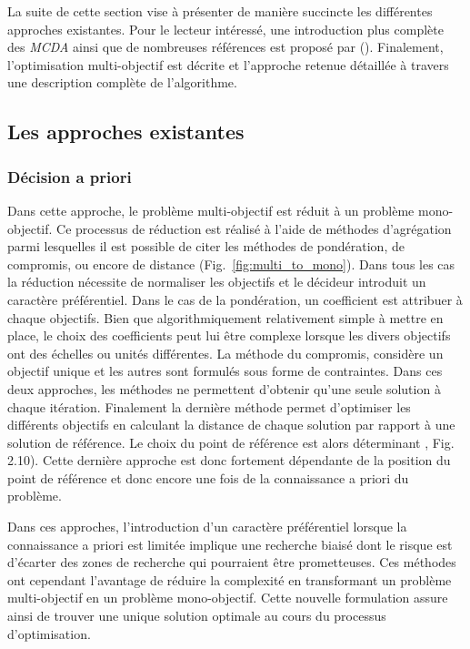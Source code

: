 La suite de cette section vise à présenter de manière succincte les différentes
approches existantes. Pour le lecteur intéressé, une introduction plus complète
des \textit{MCDA} ainsi que de nombreuses références est proposé par ().
Finalement, l’optimisation multi-objectif est décrite et l’approche retenue
détaillée à travers une description complète de l’algorithme.

\subsection{Les approches existantes} %
\label{sub:les_approches_existantes}
\subsubsection{Décision a priori} %
\label{ssub:decision_a_priori}
Dans cette approche, le problème multi-objectif est réduit à un problème mono-objectif.
Ce processus de réduction est réalisé à l’aide de méthodes d’agrégation parmi lesquelles
il est possible de citer les méthodes de pondération, de compromis,
ou encore de distance (Fig.~\ref{fig:multi_to_mono}). Dans tous les cas la réduction
nécessite de normaliser les objectifs et le décideur introduit un caractère préférentiel.
Dans le cas de la pondération, un coefficient est attribuer à chaque objectifs. Bien que
algorithmiquement relativement simple à mettre en place, le choix des coefficients peut
lui être complexe lorsque les divers objectifs ont des échelles ou unités différentes.
La méthode du compromis, considère un objectif unique et les autres sont formulés
sous forme de contraintes. Dans ces deux approches, les méthodes ne permettent
d’obtenir qu’une seule solution à chaque itération.
Finalement la dernière méthode permet d’optimiser les différents objectifs en calculant
la distance de chaque solution par rapport à une solution de référence. Le choix
du point de référence est alors déterminant \parencite{Collette2002}, Fig. 2.10).
Cette dernière approche est donc fortement dépendante de la position du point de
référence et donc encore une fois de la connaissance a priori du problème.

Dans ces approches, l’introduction d’un caractère préférentiel lorsque la connaissance a priori
est limitée implique une recherche biaisé dont le risque est d’écarter des zones
de recherche qui pourraient être prometteuses. Ces méthodes ont cependant l’avantage
de réduire la complexité en transformant un problème multi-objectif en un problème
mono-objectif. Cette nouvelle formulation assure ainsi de trouver une unique solution
optimale au cours du processus d’optimisation.

